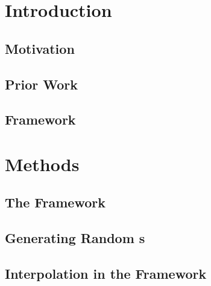 \section{Introduction} 
\subsection{Motivation}
\subsection{Prior Work}
\subsection{ Framework}
\section{Methods} 
\subsection{The  Framework}
\subsection{Generating Random s}
\subsection{Interpolation in the  Framework}
